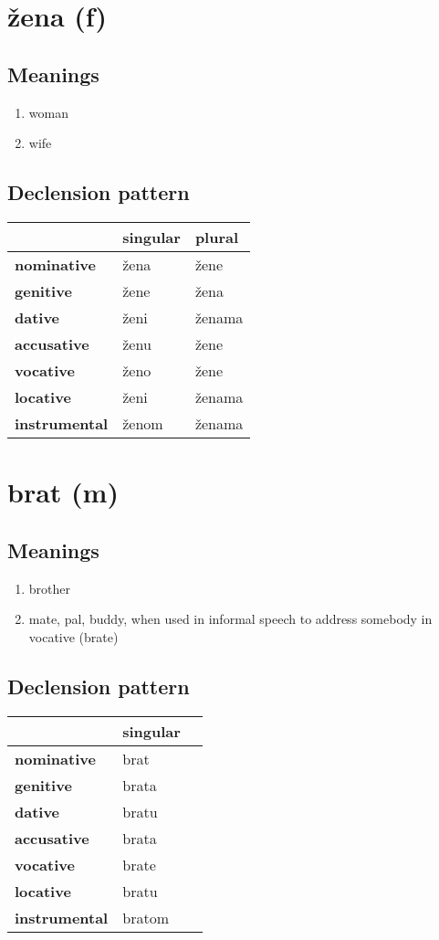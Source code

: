 \filbreak
\section{žena (f)}
\subsection*{Meanings}
\begin{enumerate}
\item woman
\item wife
\end{enumerate}
\subsection*{Declension pattern}
\begin{tabularx}{\linewidth}{Xll}
\toprule
{} & singular &  plural \\
\midrule
\textbf{nominative  } &     žena &    žene \\
\textbf{genitive    } &     žene &    žena \\
\textbf{dative      } &     ženi &  ženama \\
\textbf{accusative  } &     ženu &    žene \\
\textbf{vocative    } &     ženo &    žene \\
\textbf{locative    } &     ženi &  ženama \\
\textbf{instrumental} &    ženom &  ženama \\
\bottomrule
\end{tabularx}

\filbreak
\section{brat (m)}
\subsection*{Meanings}
\begin{enumerate}
\item brother
\item mate, pal, buddy, when used in informal speech to address somebody in vocative (brate)
\end{enumerate}
\subsection*{Declension pattern}
\begin{tabularx}{\linewidth}{Xll}
\toprule
{} & singular \\
\midrule
\textbf{nominative  } &     brat \\
\textbf{genitive    } &    brata \\
\textbf{dative      } &    bratu \\
\textbf{accusative  } &    brata \\
\textbf{vocative    } &    brate \\
\textbf{locative    } &    bratu \\
\textbf{instrumental} &   bratom \\
\bottomrule
\end{tabularx}

